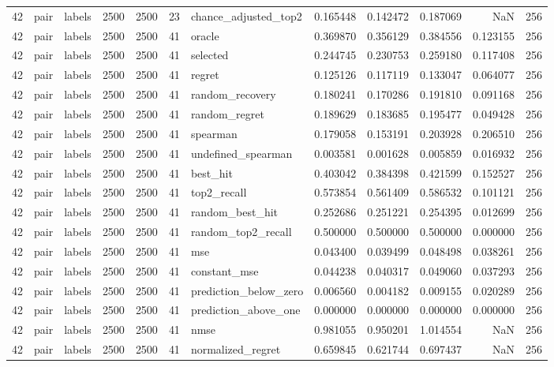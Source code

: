 \begin{tabular}{rllrrrlrrrrr}
42 & pair & labels & 2500 & 2500 & 23 & chance_adjusted_top2 & 0.165448 & 0.142472 & 0.187069 & NaN & 256 \\
42 & pair & labels & 2500 & 2500 & 41 & oracle & 0.369870 & 0.356129 & 0.384556 & 0.123155 & 256 \\
42 & pair & labels & 2500 & 2500 & 41 & selected & 0.244745 & 0.230753 & 0.259180 & 0.117408 & 256 \\
42 & pair & labels & 2500 & 2500 & 41 & regret & 0.125126 & 0.117119 & 0.133047 & 0.064077 & 256 \\
42 & pair & labels & 2500 & 2500 & 41 & random_recovery & 0.180241 & 0.170286 & 0.191810 & 0.091168 & 256 \\
42 & pair & labels & 2500 & 2500 & 41 & random_regret & 0.189629 & 0.183685 & 0.195477 & 0.049428 & 256 \\
42 & pair & labels & 2500 & 2500 & 41 & spearman & 0.179058 & 0.153191 & 0.203928 & 0.206510 & 256 \\
42 & pair & labels & 2500 & 2500 & 41 & undefined_spearman & 0.003581 & 0.001628 & 0.005859 & 0.016932 & 256 \\
42 & pair & labels & 2500 & 2500 & 41 & best_hit & 0.403042 & 0.384398 & 0.421599 & 0.152527 & 256 \\
42 & pair & labels & 2500 & 2500 & 41 & top2_recall & 0.573854 & 0.561409 & 0.586532 & 0.101121 & 256 \\
42 & pair & labels & 2500 & 2500 & 41 & random_best_hit & 0.252686 & 0.251221 & 0.254395 & 0.012699 & 256 \\
42 & pair & labels & 2500 & 2500 & 41 & random_top2_recall & 0.500000 & 0.500000 & 0.500000 & 0.000000 & 256 \\
42 & pair & labels & 2500 & 2500 & 41 & mse & 0.043400 & 0.039499 & 0.048498 & 0.038261 & 256 \\
42 & pair & labels & 2500 & 2500 & 41 & constant_mse & 0.044238 & 0.040317 & 0.049060 & 0.037293 & 256 \\
42 & pair & labels & 2500 & 2500 & 41 & prediction_below_zero & 0.006560 & 0.004182 & 0.009155 & 0.020289 & 256 \\
42 & pair & labels & 2500 & 2500 & 41 & prediction_above_one & 0.000000 & 0.000000 & 0.000000 & 0.000000 & 256 \\
42 & pair & labels & 2500 & 2500 & 41 & nmse & 0.981055 & 0.950201 & 1.014554 & NaN & 256 \\
42 & pair & labels & 2500 & 2500 & 41 & normalized_regret & 0.659845 & 0.621744 & 0.697437 & NaN & 256 \\

\end{tabular}
